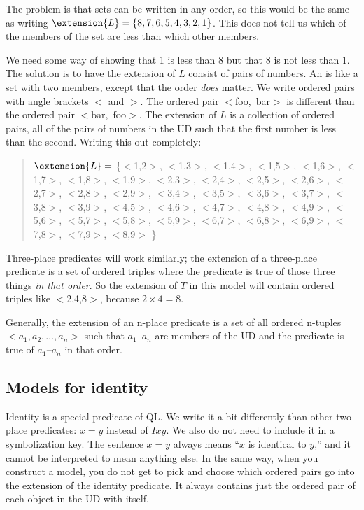 The problem is that sets can be written in any order, so this would be the same as writing $\extension{L}=\{8,7,6,5,4,3,2,1\}$. This does not tell us which of the members of the set are less than which other members.

We need some way of showing that 1 is less than 8 but that 8 is not less than 1. The solution is to have the extension of $L$ consist of pairs of numbers. An  is like a set with two members, except that the order \emph{does} matter. We write ordered pairs with angle brackets $<$ and $>$. The ordered pair \mbox{$<$foo, bar$>$} is different than the ordered pair \mbox{$<$bar, foo$>$}. The extension of $L$ is a collection of ordered pairs, all of the pairs of numbers in the UD such that the first number is less than the second. Writing this out completely:
\begin{quote}
$\extension{L}=$ \{$<$1,2$>$, $<$1,3$>$, $<$1,4$>$, $<$1,5$>$, $<$1,6$>$, $<$1,7$>$, $<$1,8$>$, $<$1,9$>$,
$<$2,3$>$, $<$2,4$>$, $<$2,5$>$, $<$2,6$>$, $<$2,7$>$, $<$2,8$>$, $<$2,9$>$,
$<$3,4$>$, $<$3,5$>$, $<$3,6$>$, $<$3,7$>$, $<$3,8$>$, $<$3,9$>$,
$<$4,5$>$, $<$4,6$>$, $<$4,7$>$, $<$4,8$>$, $<$4,9$>$,
$<$5,6$>$, $<$5,7$>$, $<$5,8$>$, $<$5,9$>$,
$<$6,7$>$, $<$6,8$>$, $<$6,9$>$,
$<$7,8$>$, $<$7,9$>$,
$<$8,9$>$%
\}
\end{quote}

Three-place predicates will work similarly; the extension of a three-place predicate is a set of ordered triples where the predicate is true of those three things \emph{in that order}. So the extension of $T$ in this model will contain ordered triples like $<$2,4,8$>$, because $2\times 4 = 8$.

Generally, the extension of an n-place predicate is a set of all ordered n-tuples ${<}a_1, a_2,\ldots, a_n{>}$ such that $a_1$--$a_n$ are members of the UD and the predicate is true of $a_1$--$a_n$ in that order.


\subsection{Models for identity}
Identity is a special predicate of QL. We write it a bit differently than other two-place predicates: $x=y$ instead of $Ixy$. We also do not need to include it in a symbolization key. The sentence $x=y$ always means ``$x$ is identical to $y$,''  and it cannot be interpreted to mean anything else. In the same way, when you construct a model, you do not get to pick and choose which ordered pairs go into the extension of the identity predicate. It always contains just the ordered pair of each object in the UD with itself.

